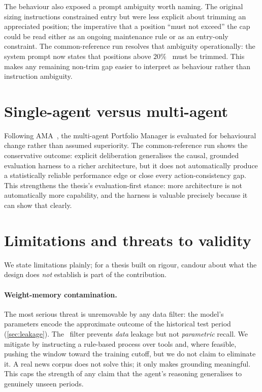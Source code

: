 The behaviour also exposed a prompt ambiguity worth naming. The original sizing instructions
constrained entry but were less explicit about trimming an appreciated position; the imperative
that a position ``must not exceed'' the cap could be read either as an ongoing maintenance rule
or as an entry-only constraint. The common-reference run resolves that ambiguity operationally:
the system prompt now states that positions above $20\%$ \nav\ must be trimmed. This makes any
remaining non-trim gap easier to interpret as behaviour rather than instruction ambiguity.

\section{Single-agent versus multi-agent}

Following AMA~\cite{ama2025}, the multi-agent Portfolio Manager is evaluated for behavioural
change rather than assumed superiority. The common-reference run shows the conservative
outcome: explicit deliberation generalises the causal, grounded evaluation harness to a richer
architecture, but it does not automatically produce a statistically reliable performance edge
or close every action-consistency gap. This strengthens the thesis's evaluation-first stance:
more architecture is not automatically more capability, and the harness is valuable precisely
because it can show that clearly.

\section{Limitations and threats to validity}
\label{sec:limitations}

We state limitations plainly; for a thesis built on rigour, candour about what the design does
\emph{not} establish is part of the contribution.

\paragraph{Weight-memory contamination.} The most serious threat is unremovable by any data
filter: the model's parameters encode the approximate outcome of the historical test period
(\cref{sec:leakage}). The \tnow\ filter prevents \emph{data} leakage but not \emph{parametric}
recall. We mitigate by instructing a rule-based process over tools and, where feasible,
pushing the window toward the training cutoff, but we do not claim to eliminate it. A real news
corpus does not solve this; it only makes grounding meaningful. This caps the strength of any
claim that the agent's reasoning generalises to genuinely unseen periods.

